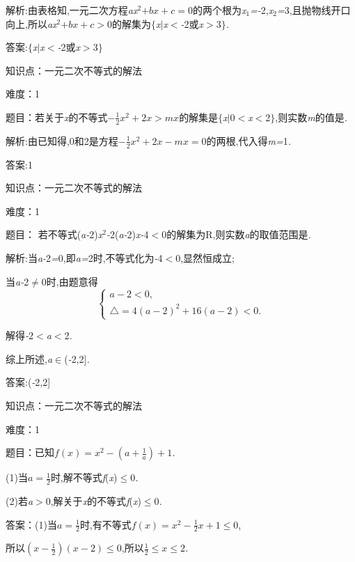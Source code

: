 \documentclass{article} %
\begin{document}
 解析:由表格知,一元二次方程\textit{ax}${}^{2}$\textit{$+bx+c=$}0的两个根为\textit{x}${}_{1}$\textit{=-}2,\textit{x}${}_{2}$\textit{=}3,且抛物线开口向上,所以\textit{ax}${}^{2}$\textit{$+bx+c>$}0的解集为$\mathrm{\{}$\textit{x$ |$x$<$-}2或\textit{x$>$}3$\mathrm{\}}$\textit{.}

 答案:$\mathrm{\{}$\textit{x$ |$x$<$-}2或\textit{x$>$}3$\mathrm{\}}$

知识点：一元二次不等式的解法

难度：1

 
题目：若关于\textit{x}的不等式$ -\frac{1}{2}x^2+2x>mx$的解集是$\mathrm{\{}$\textit{x$ |$}0\textit{$<$x$<$}2$\mathrm{\}}$,则实数\textit{m}的值是\textit{\underbar{　　　　　}.~}

 解析:由已知得,0和2是方程$ -\frac{1}{2}x^2+2x-mx=0 $的两根,代入得\textit{m=}1\textit{.}

 答案:1

知识点：一元二次不等式的解法

难度：1

 题目： 若不等式(\textit{a-}2)\textit{x}${}^{2}$\textit{-}2(\textit{a-}2)\textit{x-}4\textit{$<$}0的解集为R,则实数\textit{a}的取值范围是\textit{\underbar{　　　　　}.~}

 解析:当\textit{a-}2\textit{=}0,即\textit{a=}2时,不等式化为\textit{-}4\textit{$<$}0,显然恒成立;

当\textit{a-}2$\mathrm{\neq}$0时,由题意得
\[
\begin{cases}
a-2<0,\\
\bigtriangleup=4{(a-2)}^2+16(a-2)<0.
\end{cases}
\]

解得\textit{-}2\textit{$<$a$<$}2\textit{.}

综上所述,\textit{a}$\mathrm{\in}$(\textit{-}2,2]\textit{.}

 答案:(\textit{-}2,2]

知识点：一元二次不等式的解法

难度：1

 题目：已知$ f(x)=x^2-(a+\frac{1}{a})+1$\textit{.}

 (1)当\textit{$a=\frac{1}{2}$}时,解不等式\textit{f}(\textit{x})$\mathrm{\le}$0\textit{.}

 (2)若\textit{a$>$}0,解关于\textit{x}的不等式\textit{f}(\textit{x})$\mathrm{\le}$0\textit{.}

 答案：(1)当\textit{$a=\frac{1}{2}$}时,有不等式$f(x)=x^2-\frac{1}{2}x+1\le 0$,

所以$ (x-\frac{1}{2})(x-2)\le 0$,所以$ \frac{1}{2}\le x\le 2$\textit{.}
\end{document}
